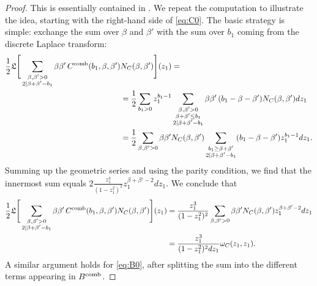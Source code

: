\documentclass[a4paper,11pt,english]{article}
\theoremstyle{plain}
\theoremstyle{definition}
\theoremstyle{plain}
\begin{document}
\begin{proof}
	This is essentially contained in \cite[lemma~1]{Nor13}.
	We repeat the computation to illustrate the idea, starting with the right-hand side of \cref{eq:C0}.
	The basic strategy is simple: exchange the sum over $\beta$ and $\beta'$ with the sum over $b_1$ coming from the discrete Laplace transform:
	\begin{equation}
	\begin{split}
		\frac{1}{2}
		\mathfrak{L}\Bigg[
			\sum_{\substack{\beta,\beta' > 0 \\ 2 \mid \beta + \beta' - b_1}} \beta \beta' \, C^{\textup{comb}}(b_1,\beta,\beta') &N_C(\beta,\beta') 
		\Bigg](z_1)
		= \\
		&=
		\frac{1}{2}
			\sum_{b_1 > 0} z_1^{b_1-1}
				\sum_{\substack{\beta,\beta' > 0 \\ \beta + \beta' \le b_1 \\ 2 \mid \beta + \beta' - b_1}} \beta \beta' \, (b_1 - \beta - \beta') N_C(\beta,\beta') dz_1 \\
		&=
		\frac{1}{2}
		\sum_{\beta,\beta' > 0}
			\beta \beta' N_C(\beta,\beta')
			\sum_{\substack{b_1 \ge \beta+\beta' \\ 2 \mid \beta + \beta' - b_1}}
				(b_1 - \beta - \beta') z_1^{b_1-1} dz_1.
	\end{split}
	\end{equation}
	Summing up the geometric series and using the parity condition, we find that the innermost sum equals $2 \frac{z_1^3}{(1-z_1^2)^2} z_1^{\beta+\beta'-2} dz_1$. We conclude that
	\begin{equation}
	\begin{split}
		\frac{1}{2}
		\mathfrak{L}\Bigg[
			\sum_{\substack{\beta,\beta' > 0 \\ 2 \mid \beta + \beta' - b_1}} \beta \beta' \, C^{\textup{comb}}(b_1,\beta,\beta') N_C(\beta,\beta') 
		\Bigg](z_1)
		&=
		\frac{z_1^3}{(1-z_1^2)^2}
		\sum_{\beta,\beta' > 0}
			\beta \beta' N_C(\beta,\beta')
			z_1^{\beta+\beta'-2}  dz_1 \\
		&=
		\frac{z_1^3}{(1-z_1^2)^2 dz_1} \omega_C(z_1,z_1) .
	\end{split}
	\end{equation}
	A similar argument holds for \cref{eq:B0}, after splitting the sum into the different terms appearing in $B^{\textup{comb}}$.
\end{proof}
\end{document}
